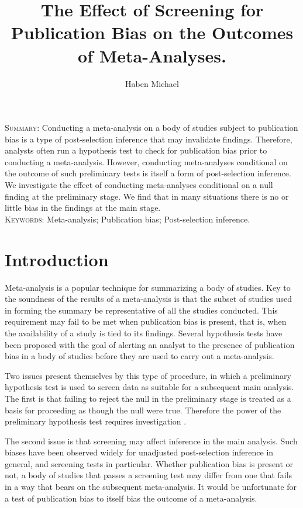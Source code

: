 \documentclass[12pt]{article}
\title{The Effect of Screening for Publication Bias on the Outcomes of Meta-Analyses.}
\author[1]{Haben Michael}
\affil[1]{University of Massachusetts, Amherst, MA (hmichael@math.umass.edu)}
\date{}
\begin{document}
\maketitle

\noindent \textsc{Summary}: Conducting a meta-analysis on a body of
studies subject to publication bias is a type of post-selection
inference that may invalidate findings. Therefore, analysts often run
a hypothesis test to check for publication bias prior to conducting a
meta-analysis. However, conducting meta-analyses conditional on the
outcome of such preliminary tests is itself a form of post-selection
inference. We investigate the effect of conducting meta-analyses
conditional on a null finding at the preliminary stage. We find that
in many situations there is no or little bias in the findings at the
main stage.
\\
\textsc{Keywords}: Meta-analysis; Publication bias; Post-selection
inference.



\section{Introduction}
Meta-analysis is a popular technique for summarizing a body of
studies. Key to the soundness of the results of a meta-analysis is
that the subset of studies used in forming the summary be
representative of all the studies conducted. This requirement may fail
to be met when publication bias is present, that is, when the
availability of a study is tied to its findings. Several hypothesis tests have been proposed with the goal
of alerting an analyst to the presence of publication bias in a body
of studies before they are used to carry out a meta-analysis.

Two issues present themselves by this type of procedure,
in which a preliminary hypothesis test is used to screen data as suitable
for a subsequent main analysis. The first is that failing to reject
the null in the preliminary stage is treated as a basis for proceeding as
though the null were true. Therefore the power of the preliminary
hypothesis test requires investigation \citep{michael:inpress-a, michael:inpress-b}.

The second issue is that screening may affect inference in the main
analysis. Such biases have been observed widely for unadjusted post-selection
inference in general, and screening tests in particular. Whether
publication bias is present or not, a body of studies that passes a
screening test may differ from one that fails in a way that bears on
the subsequent meta-analysis. It would be unfortunate for a test of
publication bias to itself bias the outcome of a meta-analysis.
\end{document}
